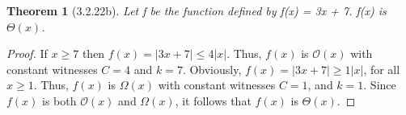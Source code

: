 \documentclass[a4paper, 12pt]{article}
\theoremstyle{plain}
\newtheorem*{theorem*}{Theorem}
\begin{document}
	
	\begin{theorem*}[3.2.22b]
		Let f be the function defined by f(x) = 3x + 7. \newline f(x) is $\Theta(x)$.
	\end{theorem*}
	
	\begin{proof}
		If $x \ge 7$ then $f(x) = |3x + 7| \le 4|x|$. Thus, $f(x)$ is $\mathcal{O}(x)$ with constant witnesses $C = 4$ and $k = 7$. Obviously, $f(x) = |3x + 7| \ge 1|x|$, for all $x \ge 1$. Thus, $f(x)$ is $\Omega(x)$ with constant witnesses $C = 1$, and $k = 1$. Since $f(x)$ is both $\mathcal{O}(x)$ and $\Omega(x)$, it follows that $f(x)$ is $\Theta(x)$.
	\end{proof}
\end{document}
